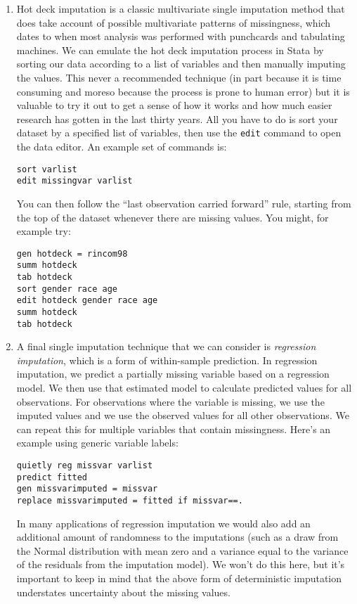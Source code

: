 \documentclass[a4paper,12pt]{article}
\begin{document}
\begin{enumerate}
\item Hot deck imputation is a classic multivariate single imputation method that does take account of possible multivariate patterns of missingness, which dates to when most analysis was performed with punchcards and tabulating machines. We can emulate the hot deck imputation process in Stata by sorting our data according to a list of variables and then manually imputing the values. This never a recommended technique (in part because it is time consuming and moreso because the process is prone to human error) but it is valuable to try it out to get a sense of how it works and how much easier research has gotten in the last thirty years. All you have to do is sort your dataset by a specified list of variables, then use the \texttt{edit} command to open the data editor. An example set of commands is:
\begin{verbatim}
sort varlist
edit missingvar varlist
\end{verbatim}

You can then follow the ``last observation carried forward'' rule, starting from the top of the dataset whenever there are missing values. You might, for example try:
\begin{verbatim}
gen hotdeck = rincom98
summ hotdeck
tab hotdeck
sort gender race age
edit hotdeck gender race age
summ hotdeck
tab hotdeck
\end{verbatim}

\item A final single imputation technique that we can consider is {\em regression imputation}, which is a form of within-sample prediction. In regression imputation, we predict a partially missing variable based on a regression model. We then use that estimated model to calculate predicted values for all observations. For observations where the variable is missing, we use the imputed values and we use the observed values for all other observations. We can repeat this for multiple variables that contain missingness. Here's an example using generic variable labels:
\begin{verbatim}
quietly reg missvar varlist
predict fitted
gen missvarimputed = missvar
replace missvarimputed = fitted if missvar==.
\end{verbatim}

In many applications of regression imputation we would also add an additional amount of randomness to the imputations (such as a draw from the Normal distribution with mean zero and a variance equal to the variance of the residuals from the imputation model). We won't do this here, but it's important to keep in mind that the above form of deterministic imputation understates uncertainty about the missing values.


\end{enumerate}
\end{document}
